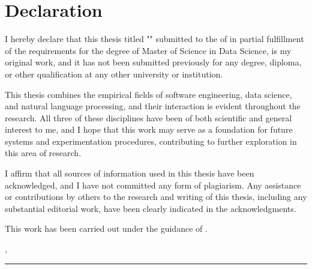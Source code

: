 %
\chapter*{Declaration}
\label{sec:declaration}
\thispagestyle{empty}

I hereby declare that this thesis titled "\thesisTitle" submitted to the \thesisUniversityDepartment of \thesisUniversity in partial fulfillment of the requirements for the degree of Master of Science in Data Science, is my original work, and it has not been submitted previously for any degree, diploma, or other qualification at any other university or institution.

This thesis combines the empirical fields of software engineering, data science, and natural language processing, and their interaction is evident throughout the research. All three of these disciplines have been of both scientific and general interest to me, and I hope that this work may serve as a foundation for future systems and experimentation procedures, contributing to further exploration in this area of research.

I affirm that all sources of information used in this thesis have been acknowledged, and I have not committed any form of plagiarism. Any assistance or contributions by others to the research and writing of this thesis, including any substantial editorial work, have been clearly indicated in the acknowledgments.

This work has been carried out under the guidance of \thesisSupervisorTitle \thesisSupervisor.

\bigskip

\noindent\textit{\thesisUniversityCity, \thesisDate}

\smallskip

\begin{flushright}
	\begin{minipage}{5cm}
		\rule{\textwidth}{1pt}
		\centering\thesisAuthor
	\end{minipage}
\end{flushright}

